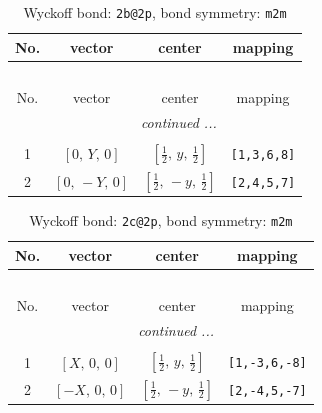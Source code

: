 \documentclass[fleqn,8pt]{jsarticle}
\begin{document}
\renewcommand{\arraystretch}{1.2}
\begin{longtable}{cccc}
\caption{Wyckoff bond: {\tt 2b@2p}, bond symmetry: {\tt m2m}}
 \\
 \hline \hline
No. & vector & center & mapping \\ \hline \endfirsthead

\multicolumn{3}{l}{\tablename\ \thetable{}} \\
 \hline \hline
No. & vector & center & mapping \\ \hline \endhead

 \hline \hline
\multicolumn{3}{r}{\footnotesize\it continued ...} \\ \endfoot

 \hline \hline
\multicolumn{3}{r}{} \\ \endlastfoot

1 & $\left[ 0,\, Y,\, 0 \right]$ & $\left[ \frac{1}{2},\, y,\, \frac{1}{2} \right]$ & {\tt [1,3,6,8]} \\ \hline
2 & $\left[ 0,\, - Y,\, 0 \right]$ & $\left[ \frac{1}{2},\, - y,\, \frac{1}{2} \right]$ & {\tt [2,4,5,7]} \\
\end{longtable}
\renewcommand{\arraystretch}{1.2}
\begin{longtable}{cccc}
\caption{Wyckoff bond: {\tt 2c@2p}, bond symmetry: {\tt m2m}}
 \\
 \hline \hline
No. & vector & center & mapping \\ \hline \endfirsthead

\multicolumn{3}{l}{\tablename\ \thetable{}} \\
 \hline \hline
No. & vector & center & mapping \\ \hline \endhead

 \hline \hline
\multicolumn{3}{r}{\footnotesize\it continued ...} \\ \endfoot

 \hline \hline
\multicolumn{3}{r}{} \\ \endlastfoot

1 & $\left[ X,\, 0,\, 0 \right]$ & $\left[ \frac{1}{2},\, y,\, \frac{1}{2} \right]$ & {\tt [1,-3,6,-8]} \\ \hline
2 & $\left[ - X,\, 0,\, 0 \right]$ & $\left[ \frac{1}{2},\, - y,\, \frac{1}{2} \right]$ & {\tt [2,-4,5,-7]} \\
\end{longtable}
\renewcommand{\arraystretch}{1.2}
\end{document}
